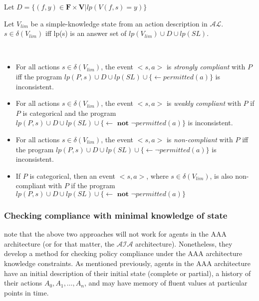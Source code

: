Let $D = \{ (f,y) \in \boldsymbol{F} \times \boldsymbol{V} | lp(V(f,s)=y)\}$

\begin{definition}
    Let $V_{lim}$ be a simple-knowledge state from an action description in $\mathcal{AL}$.
    $s \in \delta(V_{lim})$ iff lp(s) is an answer set of $lp(V_{lim}) \cup D \cup lp(SL)$.
\end{definition}

\begin{definition}
    ~

    \begin{itemize}
        \item For all actions $s \in \delta(V_{lim})$, the event $<s, a>$ is \textit{strongly compliant} with $P$ iff the program $lp(P, s) \cup D \cup lp(SL) \cup \{ \leftarrow permitted(a) \}$ is inconsistent.
        \item For all actions $s \in \delta(V_{lim})$, the event $<s, a>$ is \textit{weakly compliant} with $P$ if $P$ is categorical and the program $lp(P, s) \cup D \cup lp(SL) \cup \{ \leftarrow \textbf{ not } \neg permitted(a) \}$ is inconsistent.
        \item For all actions $s \in \delta(V_{lim})$, the event $<s, a>$ is \textit{non-compliant} with $P$ iff the program $lp(P, s) \cup D \cup lp(SL) \cup \{ \leftarrow \neg permitted(a) \}$ is inconsistent.
        \item If $P$ is categorical, then an event $<s, a>$, where $s \in \delta(V_{lim})$, is also non-compliant with $P$ if the program $lp(P,s) \cup D \cup lp(SL) \cup \{ \leftarrow \textbf{ not } \neg permitted(a) \}$
    \end{itemize}
\end{definition}

\subsubsection{Checking compliance with minimal knowledge of state}

\citet{gelfond_authorization_2008} note that the above two approaches will not work for agents in the AAA architecture (or for that matter, the $\mathcal{AIA}$ architecture).
Nonetheless, they develop a method for checking policy compliance under the AAA architecture knowledge constraints.
As mentioned previously, agents in the AAA architecture have an initial description of their initial state (complete or partial), a history of their actions $A_0, A_1, \dots, A_n$, and may have memory of fluent values at particular points in time.

